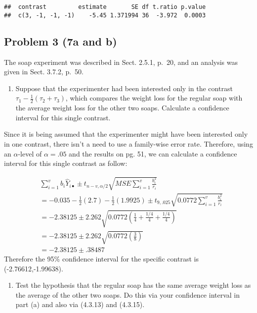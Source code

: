 \documentclass[12pt,]{article}
\providecommand{\tightlist}{%
  \setlength{\itemsep}{0pt}\setlength{\parskip}{0pt}}
\begin{document}
\begin{verbatim}
##  contrast         estimate       SE df t.ratio p.value
##  c(3, -1, -1, -1)    -5.45 1.371994 36  -3.972  0.0003
\end{verbatim}

\subsection{Problem 3 (7a and b)}\label{problem-3-7a-and-b}

The soap experiment was described in Sect. 2.5.1, p.~20, and an analysis
was given in Sect. 3.7.2, p.~50.

\begin{enumerate}
\def\labelenumi{(\alph{enumi})}
\tightlist
\item
  Suppose that the experimenter had been interested only in the contrast
  \(\tau_1 - \frac{1}{2}(\tau_2 + \tau_3)\), which compares the weight
  loss for the regular soap with the average weight loss for the other
  two soaps. Calculate a confidence interval for this single contrast.
\end{enumerate}

Since it is being assumed that the experimenter might have been
interested only in one contrast, there isn't a need to use a family-wise
error rate. Therefore, using an \(\alpha\)-level of \(\alpha=.05\) and
the results on pg. 51, we can calculate a confidence interval for this
single contrast as follow:

\[
\begin{aligned}
& \sum_{i=1}^v b_i\hat{Y}_{i\bullet} \pm t_{n-v,\alpha/2} \sqrt{MSE \sum_{i=1}^v \frac{b_i^2}{r_i}}\\
&= -0.035- \frac{1}{2}(2.7) - \frac{1}{2}(1.9925) \pm t_{9,.025}
 \sqrt{0.0772 \sum_{i=1}^v \frac{b_i^2}{r_i}}\\
&= -2.38125 \pm 2.262\sqrt{0.0772 \left( \frac{1}{4} + \frac{1/4}{4} + \frac{1/4}{4} \right)}\\
&= -2.38125 \pm 2.262\sqrt{0.0772 \left( \frac{3}{8}  \right)}\\
&= -2.38125 \pm .38487
\end{aligned}
\] Therefore the 95\% confidence interval for the specific contrast is
(-2.76612,-1.99638).

\begin{enumerate}
\def\labelenumi{(\alph{enumi})}
\setcounter{enumi}{1}
\tightlist
\item
  Test the hypothesis that the regular soap has the same average weight
  loss as the average of the other two soaps. Do this via your
  confidence interval in part (a) and also via (4.3.13) and (4.3.15).
\end{enumerate}
\end{document}
